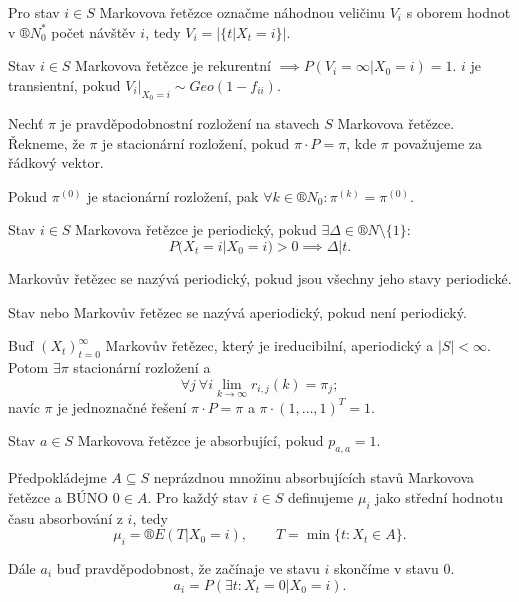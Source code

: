 \documentclass[12pt]{article}					%
\begin{document}
\begin{definice}
	Pro stav $i \in S$ Markovova řetězce označme náhodnou veličinu $V_i$ s oborem hodnot v $®N_0^*$ počet návštěv $i$, tedy $V_i = |\{t | X_t = i\}|$.
\end{definice}

\begin{veta}
	Stav $i \in S$ Markovova řetězce je rekurentní $\implies P(V_i = ∞ | X_0 = i) = 1$. $i$ je transientní, pokud $V_i|_{X_0 = i} \sim Geo(1 - f_{ii})$.
\end{veta}

\begin{definice}
	Nechť $\pi$ je pravděpodobnostní rozložení na stavech $S$ Markovova řetězce. Řekneme, že $\pi$ je stacionární rozložení, pokud $\pi·P = \pi$, kde $\pi$ považujeme za řádkový vektor.
\end{definice}

\begin{dusledek}
	Pokud $\pi^{(0)}$ je stacionární rozložení, pak $\forall k \in ®N_0: \pi^{(k)} = \pi^{(0)}$.
\end{dusledek}

\begin{definice}
	Stav $i \in S$ Markovova řetězce je periodický, pokud $\exists \Delta \in ®N \setminus \{1\}$:
	$$ P(X_t = i | X_0 = i) > 0 \implies \Delta | t. $$

	Markovův řetězec se nazývá periodický, pokud jsou všechny jeho stavy periodické.

	Stav nebo Markovův řetězec se nazývá aperiodický, pokud není periodický.
\end{definice}

\begin{veta}
	Buď $(X_t)_{t=0}^∞$ Markovův řetězec, který je ireducibilní, aperiodický a $|S| < ∞$. Potom $\exists \pi$ stacionární rozložení a
	$$ \forall j\ \forall i \lim_{k \rightarrow ∞} r_{i, j}(k) = \pi_j; $$
	navíc $\pi$ je jednoznačné řešení $\pi·P = \pi$ a $\pi·(1, …, 1)^T = 1$.
\end{veta}

\begin{definice}
	Stav $a \in S$ Markovova řetězce je absorbující, pokud $p_{a, a} = 1$.
\end{definice}

\begin{definice}
	Předpokládejme $A \subseteq S$ neprázdnou množinu absorbujících stavů Markovova řetězce a BÚNO $0 \in A$. Pro každý stav $i \in S$ definujeme $\mu_i$ jako střední hodnotu času absorbování z $i$, tedy
	$$ \mu_i = ®E(T | X_0 = i), \qquad T = \min\{t: X_t \in A\}. $$

	Dále $a_i$ buď pravděpodobnost, že začínaje ve stavu $i$ skončíme v stavu $0$.
	$$ a_i = P(\exists t: X_t = 0 | X_0 = i). $$
\end{definice}
\end{document}
